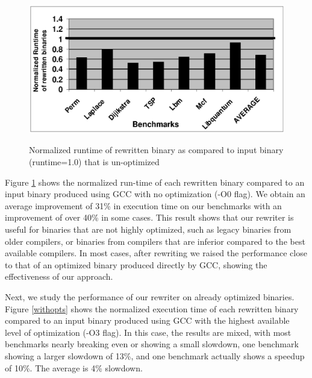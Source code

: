 \begin{figure}
\begin{centering}
\includegraphics{perfunopt4}
\par\end{centering}
\renewcommand{\baselinestretch}{1}
\small\normalsize
\begin{quote}
\caption{Normalized runtime of rewritten binary as compared to input binary (runtime=1.0) that is
un-optimized}
\label{noopts}
\end{quote}
\end{figure}
\renewcommand{\baselinestretch}{2}
\small\normalsize

Figure \ref{noopts} shows the normalized run-time of each rewritten binary compared to an input
binary produced using GCC with no optimization (-O0 flag). We obtain an average improvement of 31\%
in execution time on our benchmarks with an improvement of over 40\% in some cases. This result
shows that our rewriter is useful for binaries that are not highly optimized, such as legacy
binaries from older compilers, or binaries from compilers that are inferior compared to the best
available compilers. In most cases, after rewriting we raised the performance close to that of an
optimized binary produced directly by GCC, showing the effectiveness of our approach.

Next, we study the performance of our rewriter on already optimized binaries. Figure \ref{withopts}
shows the normalized execution time of each rewritten binary compared to an input binary produced
using GCC with the highest available level of optimization (-O3 flag). In this case, the results are
mixed, with most benchmarks nearly breaking even or showing a small slowdown, one benchmark showing
a larger slowdown of 13\%, and one benchmark actually shows a speedup of 10\%. The average is 4\%
slowdown.

